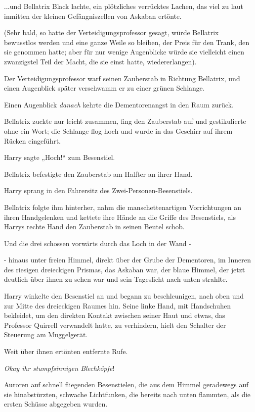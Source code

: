 {...und Bellatrix Black lachte, ein plötzliches verrücktes Lachen, das viel zu laut inmitten der kleinen Gefängniszellen von Askaban ertönte.

(Sehr bald, so hatte der Verteidigungsprofessor gesagt, würde Bellatrix bewusstlos werden und eine ganze Weile so bleiben, der Preis für den Trank, den sie genommen hatte; aber für nur wenige Augenblicke würde sie vielleicht einen zwanzigstel Teil der Macht, die sie einst hatte, wiedererlangen).

Der Verteidigungsprofessor warf seinen Zauberstab in Richtung Bellatrix, und einen Augenblick später verschwamm er zu einer grünen Schlange.

Einen Augenblick \emph{danach} kehrte die Dementorenangst in den Raum zurück.

Bellatrix zuckte nur leicht zusammen, fing den Zauberstab auf und gestikulierte ohne ein Wort; die Schlange flog hoch und wurde in das Geschirr auf ihrem Rücken eingeführt.

Harry sagte „Hoch!“ zum Besenstiel.

Bellatrix befestigte den Zauberstab am Halfter an ihrer Hand.

Harry sprang in den Fahrersitz des Zwei-Personen-Besenstiels.

Bellatrix folgte ihm hinterher, nahm die manschettenartigen Vorrichtungen an ihren Handgelenken und kettete ihre Hände an die Griffe des Besenstiels, als Harrys rechte Hand den Zauberstab in seinen Beutel schob.

Und die drei schossen vorwärts durch das Loch in der Wand -

- hinaus unter freien Himmel, direkt über der Grube der Dementoren, im Inneren des riesigen dreieckigen Prismas, das Askaban war, der blaue Himmel, der jetzt deutlich über ihnen zu sehen war und sein Tageslicht nach unten strahlte.

Harry winkelte den Besenstiel an und begann zu beschleunigen, nach oben und zur Mitte des dreieckigen Raumes hin. Seine linke Hand, mit Handschuhen bekleidet, um den direkten Kontakt zwischen seiner Haut und etwas, das Professor Quirrell verwandelt hatte, zu verhindern, hielt den Schalter der Steuerung am Muggelgerät.

Weit über ihnen ertönten entfernte Rufe.

\emph{Okay ihr stumpfsinnigen Blechköpfe}!

Auroren auf schnell fliegenden Besenstielen, die aus dem Himmel geradewegs auf sie hinabstürzten, schwache Lichtfunken, die bereits nach unten flammten, als die ersten Schüsse abgegeben wurden.

}
